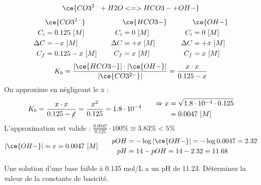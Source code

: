 \documentclass[
  11pt,
  french,
  a4paper,
  openany]{book}
\begin{document}
\begin{Answer}
\[
\ce{CO3^{2-} + H2O <=> HCO3- + OH-}
\]
\[
\begin{split}
&\ce{CO3^{2-}}\\
C_i &= 0.125\ [M] \\
\Delta C &= - x\ [M] \\
C_f &= 0.125 - x\ [M] \\
\end{split}
\qquad
\begin{split}
&\ce{HCO3-}\\
C_i &= 0\ [M] \\
\Delta C &= + x\ [M] \\
C_f &= x\ [M] \\
\end{split}
\qquad
\begin{split}
&\ce{OH-}\\
C_i &= 0\ [M] \\
\Delta C &= + x\ [M] \\
C_f &= x\ [M] \\
\end{split}
\]
\[
K_b = \frac{|\ce{HCO3-}| \cdot |\ce{OH-}|}{|\ce{CO3^{2-}}|} = \frac{x \cdot x}{0.125 - x}
\]
On approxime en négligeant le x :
\[
\begin{split}
K_b = \frac{x \cdot x}{0.125 - \cancel{x}} = \frac{x^2}{0.125} = 1.8 \cdot 10^{-4}
\end{split}
\qquad
\begin{split}
\Rightarrow x &= \sqrt{1.8 \cdot 10^{-4} \cdot 0.125} \\
  &= 0.0047\ [M]
\end{split}
\]
L'approximation est valide : \(\frac{0.0047}{0.125} \cdot 100\% \cong 3.83\% < 5\%\)
\[
\begin{split}
|\ce{OH-}| = x = 0.0047\ [M] 
\end{split}
\qquad
\begin{split}
pOH &= - \log |\ce{OH-}| = - \log 0.0047 = 2.32 \\
pH &= 14 - pOH = 14 - 2.32 = 11.68
\end{split}
\]

\end{Answer}

\begin{Exercise}
Une solution d'une base faible à 0.135 mol/L a un pH de 11.23. Déterminez la valeur de la constante de basicité.

\end{Exercise}
\end{document}
